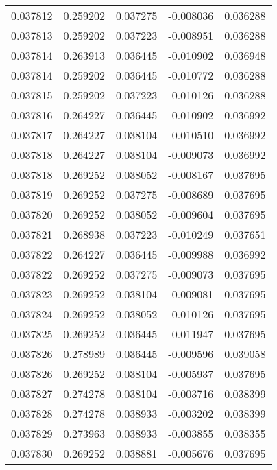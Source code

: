\begin{tabular}{lrrrr}
0.037812    &  0.259202 &  0.037275 & -0.008036 &             0.036288 \\
0.037813    &  0.259202 &  0.037223 & -0.008951 &             0.036288 \\
0.037814    &  0.263913 &  0.036445 & -0.010902 &             0.036948 \\
0.037814    &  0.259202 &  0.036445 & -0.010772 &             0.036288 \\
0.037815    &  0.259202 &  0.037223 & -0.010126 &             0.036288 \\
0.037816    &  0.264227 &  0.036445 & -0.010902 &             0.036992 \\
0.037817    &  0.264227 &  0.038104 & -0.010510 &             0.036992 \\
0.037818    &  0.264227 &  0.038104 & -0.009073 &             0.036992 \\
0.037818    &  0.269252 &  0.038052 & -0.008167 &             0.037695 \\
0.037819    &  0.269252 &  0.037275 & -0.008689 &             0.037695 \\
0.037820    &  0.269252 &  0.038052 & -0.009604 &             0.037695 \\
0.037821    &  0.268938 &  0.037223 & -0.010249 &             0.037651 \\
0.037822    &  0.264227 &  0.036445 & -0.009988 &             0.036992 \\
0.037822    &  0.269252 &  0.037275 & -0.009073 &             0.037695 \\
0.037823    &  0.269252 &  0.038104 & -0.009081 &             0.037695 \\
0.037824    &  0.269252 &  0.038052 & -0.010126 &             0.037695 \\
0.037825    &  0.269252 &  0.036445 & -0.011947 &             0.037695 \\
0.037826    &  0.278989 &  0.036445 & -0.009596 &             0.039058 \\
0.037826    &  0.269252 &  0.038104 & -0.005937 &             0.037695 \\
0.037827    &  0.274278 &  0.038104 & -0.003716 &             0.038399 \\
0.037828    &  0.274278 &  0.038933 & -0.003202 &             0.038399 \\
0.037829    &  0.273963 &  0.038933 & -0.003855 &             0.038355 \\
0.037830    &  0.269252 &  0.038881 & -0.005676 &             0.037695 \\

\end{tabular}
